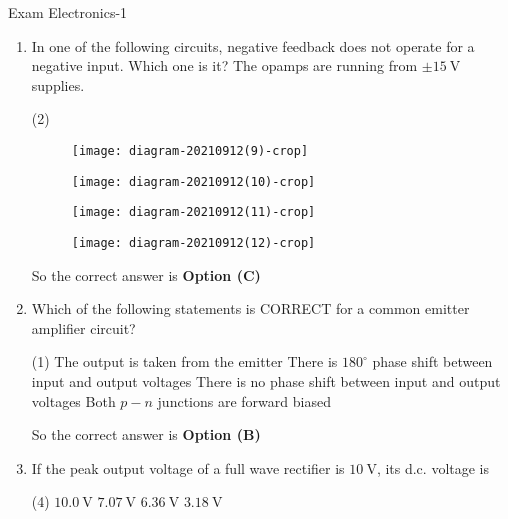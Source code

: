 \begin{abox}
	Exam Electronics-1
	\end{abox}
\begin{enumerate}
	\item In one of the following circuits, negative feedback does not operate for a negative input. Which one is it? The opamps are running from $\pm 15 \mathrm{~V}$ supplies.
\begin{tasks}(2)
\task[\textbf{A.}] \begin{figure}[H]
	\centering
	\texttt{[image: diagram-20210912(9)-crop]}
\end{figure}
\task[\textbf{B.}] \begin{figure}[H]
	\centering
	\texttt{[image: diagram-20210912(10)-crop]}
\end{figure}
\task[\textbf{C.}] \begin{figure}[H]
	\centering
	\texttt{[image: diagram-20210912(11)-crop]}
\end{figure}
\task[\textbf{D.}] \begin{figure}[H]
	\centering
	\texttt{[image: diagram-20210912(12)-crop]}
\end{figure}
\end{tasks}
\begin{answer}
So the correct answer is \textbf{Option (C)}
\end{answer}
	\item Which of the following statements is CORRECT for a common emitter amplifier circuit?
\begin{tasks}(1)
\task[\textbf{A.}] The output is taken from the emitter
\task[\textbf{B.}] There is $180^{\circ}$ phase shift between input and output voltages
\task[\textbf{C.}] There is no phase shift between input and output voltages
\task[\textbf{D.}] Both $p-n$ junctions are forward biased
\end{tasks}
\begin{answer}
So the correct answer is \textbf{Option (B)}
\end{answer}
	\item If the peak output voltage of a full wave rectifier is $10 \mathrm{~V}$, its d.c. voltage is
\begin{tasks}(4)
\task[\textbf{A.}] $10.0 \mathrm{~V}$
\task[\textbf{B.}] $7.07 \mathrm{~V}$
\task[\textbf{C.}] $6.36 \mathrm{~V}$
\task[\textbf{D.}] $3.18 \mathrm{~V}$
\end{tasks}
\begin{answer}

\end{answer}
\end{enumerate}
